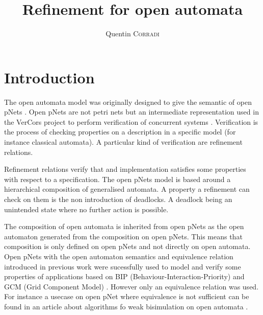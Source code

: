 \documentclass{article}
\title{Refinement for open automata}
\author{Quentin \textsc{Corradi}}
\begin{document}
\maketitle

\section{Introduction}
The open automata model was originally designed to give the semantic of open pNets \cite{2007.10770}.
Open pNets are not petri nets but an intermediate representation used in the VerCors project to perform verification of concurrent systems \cite{henrio:01252323}.
Verification is the process of checking properties on a description in a specific model (for instance classical automata).
A particular kind of verification are refinement relations.

Refinement relations verify that and implementation satisfies some properties with respect to a specification.
The open pNets model is based around a hierarchical composition of generalised automata.
A property a refinement can check on them is the non introduction of deadlocks.
A deadlock being an unintended state where no further action is possible.

The composition of open automata is inherited from open pNets as the open automaton generated from the composition on open pNets.
This means that composition is only defined on open pNets and not directly on open automata.
Open pNets with the open automaton semantics and equivalence relation introduced in previous work \cite{henrio:01299562} were sucessfully used to model and verify some properties of applications \cite{qin:01823507, ameurboulifa:01526055} based on BIP (Behaviour-Interaction-Priority) \cite{basu:hal-00722395} and GCM (Grid Component Model) \cite{baude:inria-00323919}.
However only an equivalence relation was used.
For instance a usecase on open pNet where equivalence is not sufficient can be found in an article about algorithms fo weak bisimulation on open automata \cite{wang:03126313}.
\end{document}
